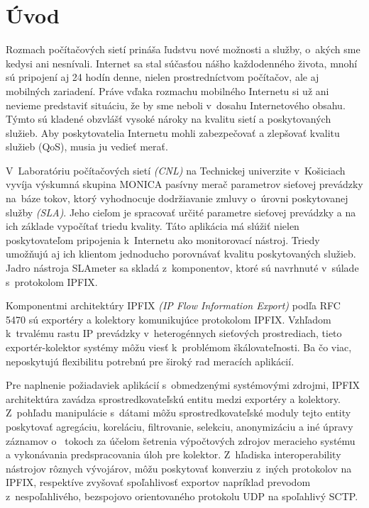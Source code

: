 \setcounter{page}{1}
\setcounter{equation}{0}
\setcounter{figure}{0}
\setcounter{table}{0}

\section*{\'Uvod}

Rozmach počítačových sietí prináša ľudstvu nové možnosti a služby, o~akých sme kedysi ani nesnívali.
Internet sa stal súčasťou nášho každodenného života, mnohí sú pripojení aj 24 hodín denne, nielen 
prostredníctvom počítačov, ale aj mobilných zariadení. Práve vďaka rozmachu mobilného Internetu si už
ani nevieme predstaviť situáciu, že by sme neboli v~dosahu Internetového obsahu. Týmto sú kladené 
obzvlášť vysoké nároky na kvalitu sietí a poskytovaných služieb. Aby poskytovatelia Internetu mohli 
zabezpečovať a zlepšovať kvalitu služieb (QoS), musia ju vedieť merať.

V~Laboratóriu počítačových sietí \emph{(CNL)} na Technickej univerzite v~Košiciach vyvíja výskumná 
skupina MONICA pasívny merač parametrov sieťovej prevádzky na~báze tokov, ktorý vyhodnocuje 
dodržiavanie zmluvy o~úrovni poskytovanej služby \emph{(SLA)}. Jeho cieľom je spracovať určité parametre 
sieťovej prevádzky a na ich základe vypočítať triedu kvality. Táto aplikácia má slúžiť nielen poskytovateľom 
pripojenia k~Internetu ako monitorovací nástroj. Triedy umožňujú aj ich klientom jednoducho 
porovnávať kvalitu poskytovaných služieb. Jadro nástroja SLAmeter sa skladá z~komponentov, ktoré sú 
navrhnuté v~súlade s~protokolom IPFIX. \citep{slameter}

Komponentmi architektúry IPFIX \emph{(IP Flow Information Export)} podľa RFC 5470 \citep{rfc5470}
sú exportéry a kolektory komunikujúce protokolom IPFIX. Vzhľadom k~trvalému rastu IP prevádzky
v~heterogénnych sieťových prostrediach, tieto exportér-kolektor systémy môžu viesť k~problémom 
škálovateľnosti. Ba čo viac, neposkytujú flexibilitu potrebnú pre široký rad meracích aplikácií.

Pre naplnenie požiadaviek aplikácií s~obmedzenými systémovými zdrojmi, IPFIX architektúra zavádza 
sprostredkovateľskú entitu medzi exportéry a kolektory. Z~pohľadu manipulácie s~dátami môžu sprostredkovateľské
moduly tejto entity poskytovať agregáciu, koreláciu, filtrovanie, selekciu, anonymizáciu a iné úpravy záznamov o~
tokoch za účelom 
šetrenia výpočtových zdrojov meracieho systému a vykonávania predspracovania úloh pre kolektor. Z~hľadiska
interoperability nástrojov rôznych vývojárov, môžu poskytovať konverziu z~iných protokolov na IPFIX, 
respektíve zvyšovať spoľahlivosť exportov napríklad prevodom z~nespoľahlivého, bezspojovo orientovaného 
protokolu UDP na spoľahlivý SCTP. \citep{rfc6183}

